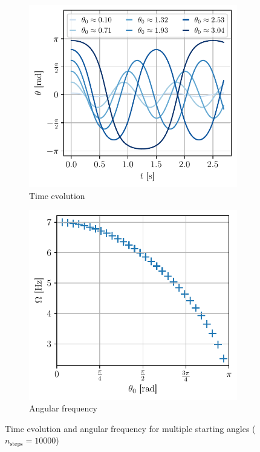\begin{figure}[h]
    \centering
    \begin{subfigure}{0.48\linewidth}
        \centering
        \includegraphics[width=\linewidth]{figures/oscillations_trajectory.pdf}
        \caption{Time evolution}
        \label{fig:oscillations_time}
    \end{subfigure}
    \begin{subfigure}{0.48\linewidth}
        \centering
        \includegraphics[width=\linewidth]{figures/angular_frequency.pdf}
        \caption{Angular frequency}
        \label{fig:angular_frequency}
    \end{subfigure}
    \caption{Time evolution and angular frequency for multiple starting angles (\(n_\textrm{steps}=10000\))}
\end{figure}


